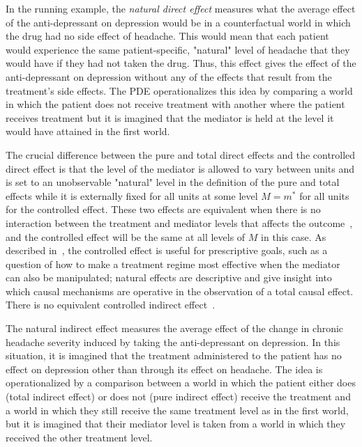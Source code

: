 In the running example, the \textit{natural direct effect} measures what the average effect of 
the anti-depressant on depression would be in a counterfactual world in which the drug had no side effect of headache. 
This would mean that each patient would experience the same patient-specific, "natural" level of headache 
that they would have if they had not taken the drug. Thus, this effect
gives the effect of the anti-depressant on depression without any of the effects that result from the treatment's 
side effects. The PDE operationalizes this idea by comparing a world in which the patient does not receive treatment with 
another where the patient receives treatment but it is imagined that the mediator is held at the level it would have
attained in the first world. 

The crucial difference between the pure and total direct effects and the controlled direct effect is that the level of the 
mediator is allowed to vary between units and is set to an unobservable "natural" level in the definition of the pure and
total effects while it is externally fixed 
for all units at some level $M = m^{*}$ for all units for the controlled effect. These two effects are equivalent when there 
is no interaction between the treatment and mediator levels that affects the outcome~\citep{pearl2001}, and the controlled 
effect will be the same at all levels of $M$ in this case. As described in~\citep{pearl2001}, the 
controlled effect is useful for prescriptive goals, such as a question of how to make a treatment regime most effective 
when the mediator can also be manipulated; natural effects are descriptive and give insight into which causal mechanisms 
are operative in the observation of a total causal effect. There is no equivalent controlled 
indirect effect~\citep{pearl2001}. 

The natural indirect effect measures the average effect of the change in chronic headache severity 
induced by taking the anti-depressant on depression. In this situation, it is imagined that the treatment administered
to the patient has no effect on depression other than through its effect on headache. The idea is operationalized by
a comparison between a world in which the patient either does (total indirect effect) or does not (pure indirect effect)
receive the treatment and a world in which they still receive the same treatment level as in the first world, 
but it is imagined that their mediator level is taken from a world in which they received the other treatment level. 


